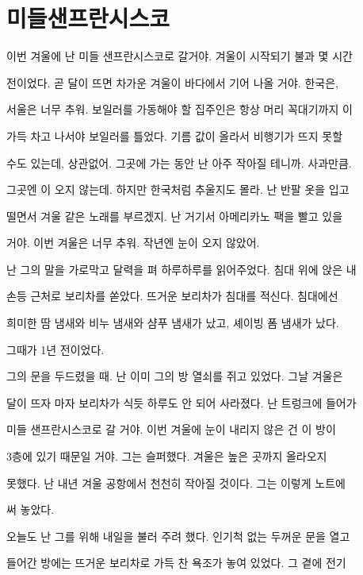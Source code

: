 \hypertarget{uxbbf8uxb4e4uxc0ccuxd504uxb780uxc2dcuxc2a4uxcf54}{%

\section{미들샌프란시스코}\label{uxbbf8uxb4e4uxc0ccuxd504uxb780uxc2dcuxc2a4uxcf54}}



이번 겨울에 난 미들 샌프란시스코로 갈거야. 겨울이 시작되기 불과 몇 시간

전이었다. 곧 달이 뜨면 차가운 겨울이 바다에서 기어 나올 거야. 한국은,

서울은 너무 추워. 보일러를 가동해야 할 집주인은 항상 머리 꼭대기까지 이

가득 차고 나서야 보일러를 틀었다. 기름 값이 올라서 비행기가 뜨지 못할

수도 있는데, 상관없어. 그곳에 가는 동안 난 아주 작아질 테니까. 사과만큼.

그곳엔 이 오지 않는데. 하지만 한국처럼 추울지도 몰라. 난 반팔 옷을 입고

떨면서 겨울 같은 노래를 부르겠지. 난 거기서 아메리카노 팩을 빨고 있을

거야. 이번 겨울은 너무 추워. 작년엔 눈이 오지 않았어.



난 그의 말을 가로막고 달력을 펴 하루하루를 읽어주었다. 침대 위에 앉은 내

손등 근처로 보리차를 쏟았다. 뜨거운 보리차가 침대를 적신다. 침대에선

희미한 땀 냄새와 비누 냄새와 샴푸 냄새가 났고, 셰이빙 폼 냄새가 났다.

그때가 1년 전이었다.



그의 문을 두드렸을 때. 난 이미 그의 방 열쇠를 쥐고 있었다. 그날 겨울은

달이 뜨자 마자 보리차가 식듯 하루도 안 되어 사라졌다. 난 트렁크에 들어가

미들 샌프란시스코로 갈 거야. 이번 겨울에 눈이 내리지 않은 건 이 방이

3층에 있기 때문일 거야. 그는 슬퍼했다. 겨울은 높은 곳까지 올라오지

못했다. 난 내년 겨울 공항에서 천천히 작아질 것이다. 그는 이렇게 노트에

써 놓았다.



오늘도 난 그를 위해 내일을 불러 주려 했다. 인기척 없는 두꺼운 문을 열고

들어간 방에는 뜨거운 보리차로 가득 찬 욕조가 놓여 있었다. 그 곁에 전기

